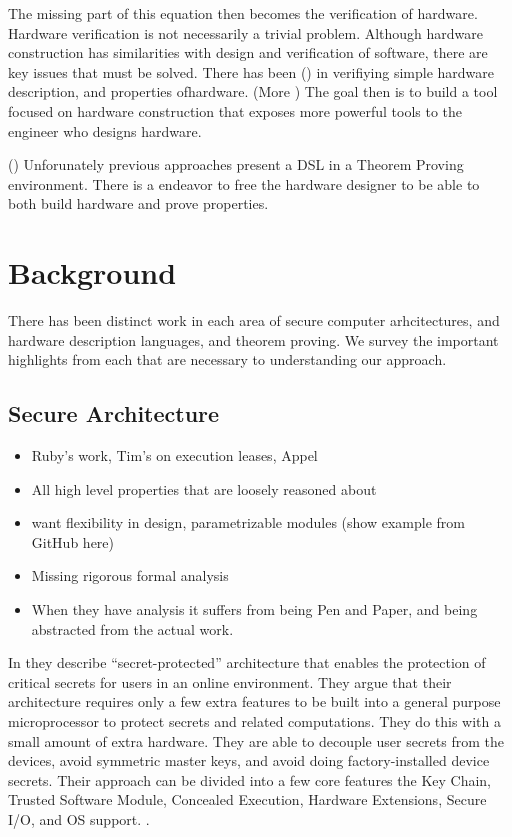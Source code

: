 \documentclass[12pt, titlepage]{article}
\begin{document}
The missing part of this equation then becomes the verification of hardware. Hardware verification is not necessarily a trivial
problem. Although hardware construction has similarities with design and verification of software, there are 
key issues that must be solved. There has been () in verifiying simple hardware description, and properties ofhardware. (More ) The goal then is to build a tool focused on hardware construction that exposes
more powerful tools to the engineer who designs hardware. 

()
Unforunately previous approaches present a DSL in a 
Theorem Proving environment. There is a endeavor to free the hardware designer to be able to both build
hardware and prove properties.

\section{Background}
There has been distinct work in each area of secure computer arhcitectures, and 
hardware description languages, and theorem proving. We survey the important highlights from each
that are necessary to understanding our approach.

\subsection{Secure Architecture}
\begin{itemize}
    \item Ruby's work, Tim's on execution leases, Appel 
    \item All high level properties that are loosely reasoned about
    \item want flexibility in design, parametrizable modules (show example from GitHub here)
    \item Missing rigorous formal analysis
    \item When they have analysis it suffers from being Pen and Paper, and being abstracted from the actual work.
\end{itemize}

In \cite{lee05} they describe “secret-protected” architecture that enables the protection of critical secrets for users in an online environment. They argue that their architecture requires only a few extra features to be built into a general purpose microprocessor to protect secrets and related computations. They do this with a small amount of extra hardware. They are able to decouple user secrets from the devices, avoid symmetric master keys, and avoid doing factory-installed device secrets. Their approach can be divided into a few core features the Key Chain, Trusted Software Module, Concealed Execution, Hardware Extensions, Secure I/O, and OS support. \cite{exec-leases} \cite{PicoCoq2013:POPL}.
\end{document}
